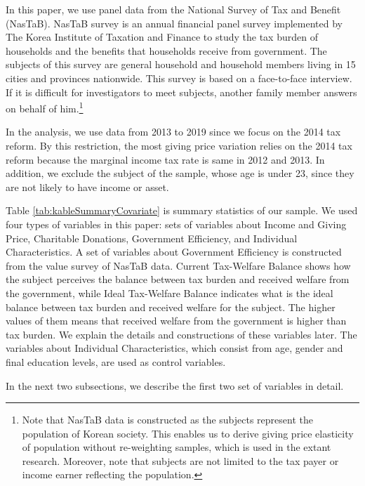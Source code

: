 \documentclass[
]{article}
\begin{document}
In this paper, we use panel data from the National Survey of Tax and Benefit (NasTaB).
NasTaB survey is an annual financial panel survey
implemented by The Korea Institute of Taxation and Finance
to study the tax burden of households and the benefits that households receive from government.
The subjects of this survey are general household and household members living in 15 cities
and provinces nationwide.
This survey is based on a face-to-face interview.
If it is difficult for investigators to meet subjects, another family member answers on behalf of him.\footnote{Note that NasTaB data is constructed as the subjects represent the population of Korean society. This enables us to derive giving price elasticity of population without re-weighting samples, which is used in the extant research. Moreover, note that subjects are not limited to the tax payer or income earner reflecting the population.}

In the analysis, we use data from 2013 to 2019 since
we focus on the 2014 tax reform.
By this restriction, the most giving price variation relies on the 2014 tax reform because
the marginal income tax rate is same in 2012 and 2013.
In addition, we exclude the subject of the sample, whose age is under 23, since they are not likely to have income or asset.

Table \ref{tab:kableSummaryCovariate} is summary statistics of our sample.
We used four types of variables in this paper:
sets of variables about Income and Giving Price,
Charitable Donations,
Government Efficiency,
and Individual Characteristics.
A set of variables about Government Efficiency is constructed from the value survey of NasTaB data.
Current Tax-Welfare Balance shows how the subject perceives the balance between tax burden and received welfare from the government,
while Ideal Tax-Welfare Balance indicates what is the ideal balance between tax burden and received welfare for the subject.
The higher values of them means that received welfare from the government is higher than tax burden.
We explain the details and constructions of these variables later.
The variables about Individual Characteristics,
which consist from age, gender and final education levels, are used as control variables.

In the next two subsections,
we describe the first two set of variables in detail.
\end{document}
